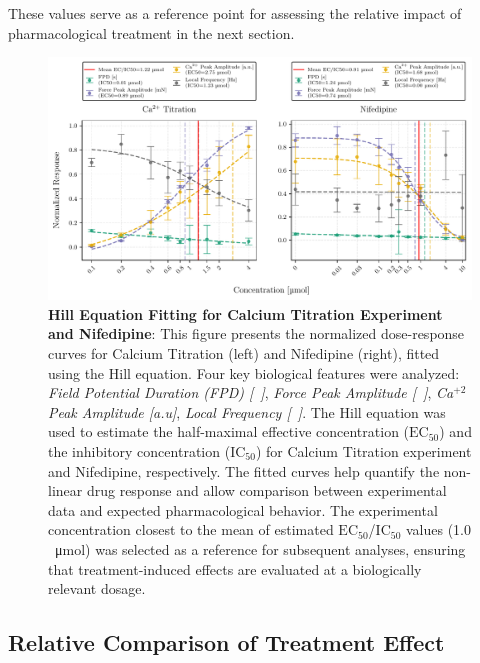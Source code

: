 \documentclass{report}
\begin{document}
        These values serve as a reference point for assessing the relative impact of pharmacological treatment in the next section.
        
        \begin{figure}[H]
            \centering
            \includegraphics[width=1.0\textwidth, height=0.8\textheight, keepaspectratio]{plots/chapter_6/ca_nifedipine_mean_hill_analysis_legend_fix.pdf}
            \caption[Hill Equation Fitting for Calcium Titration and Nifedipine.]{\textbf{Hill Equation Fitting for Calcium Titration Experiment and Nifedipine}:
            This figure presents the normalized dose-response curves for Calcium Titration (left) and Nifedipine (right), fitted using the Hill equation. Four key biological features were analyzed: \textit{Field Potential Duration (FPD) [\SI{}{\textit\s}]}, \textit{Force Peak Amplitude [\SI{}{\textit{\milli\newton}}]}, \textit{Ca$^{+2}$ Peak Amplitude [a.u]}, \textit{Local Frequency [\SI{}{\textit{\hertz}}]}. The Hill equation was used to estimate the half-maximal effective concentration (\(\text{EC}_{50}\)) and the inhibitory concentration (\(\text{IC}_{50}\)) for Calcium Titration experiment and Nifedipine, respectively. The fitted curves help quantify the non-linear drug response and allow comparison between experimental data and expected pharmacological behavior. The experimental concentration closest to the mean of estimated \(\text{EC}_{50}\)/\(\text{IC}_{50}\) values  (1.0 \SI{}{\umol}) was selected as a reference for subsequent analyses, ensuring that treatment-induced effects are evaluated at a biologically relevant dosage.}
        
            \label{fig:hill_analysis}
        \end{figure}
        
    \subsection{Relative Comparison of Treatment Effect}
    \label{sec:relative_comparison}
\end{document}
